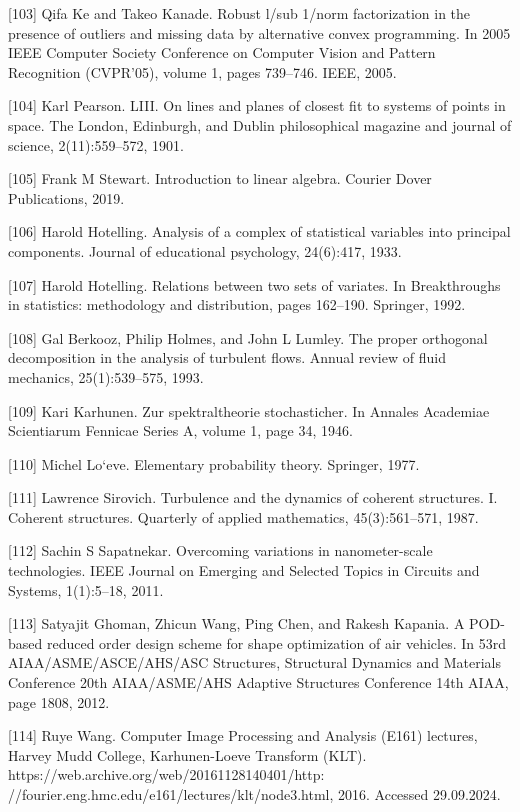 \documentclass[preprint,12pt]{elsarticle}
\begin{document}
[103] Qifa Ke and Takeo Kanade. Robust l/sub 1/norm factorization in the presence of outliers and missing data by alternative convex programming. In 2005 IEEE Computer Society Conference on Computer Vision and Pattern Recognition (CVPR’05), volume 1, pages 739–746. IEEE, 2005. 

[104] Karl Pearson. LIII. On lines and planes of closest fit to systems of points in space. The London, Edinburgh, and Dublin philosophical magazine and journal of science, 2(11):559–572, 1901. 

[105] Frank M Stewart. Introduction to linear algebra. Courier Dover Publications, 2019. 

[106] Harold Hotelling. Analysis of a complex of statistical variables into principal components. Journal of educational psychology, 24(6):417, 1933. 

[107] Harold Hotelling. Relations between two sets of variates. In Breakthroughs in statistics: methodology and distribution, pages 162–190. Springer, 1992. 

[108] Gal Berkooz, Philip Holmes, and John L Lumley. The proper orthogonal decomposition in the analysis of turbulent flows. Annual review of fluid mechanics, 25(1):539–575, 1993. 

[109] Kari Karhunen. Zur spektraltheorie stochasticher. In Annales Academiae Scientiarum Fennicae Series A, volume 1, page 34, 1946. 

[110] Michel Lo`eve. Elementary probability theory. Springer, 1977. 

[111] Lawrence Sirovich. Turbulence and the dynamics of coherent structures. I. Coherent structures. Quarterly of applied mathematics, 45(3):561–571, 1987. 

[112] Sachin S Sapatnekar. Overcoming variations in nanometer-scale technologies. IEEE Journal on Emerging and Selected Topics in Circuits and Systems, 1(1):5–18, 2011. 

[113] Satyajit Ghoman, Zhicun Wang, Ping Chen, and Rakesh Kapania. A POD-based reduced order design scheme for shape optimization of air vehicles. In 53rd AIAA/ASME/ASCE/AHS/ASC Structures, Structural Dynamics and Materials Conference 20th AIAA/ASME/AHS Adaptive Structures Conference 14th AIAA, page 1808, 2012. 

[114] Ruye Wang. Computer Image Processing and Analysis (E161) lectures, Harvey Mudd College, Karhunen-Loeve Transform (KLT). https://web.archive.org/web/20161128140401/http: //fourier.eng.hmc.edu/e161/lectures/klt/node3.html, 2016. Accessed 29.09.2024. 
\end{document}
